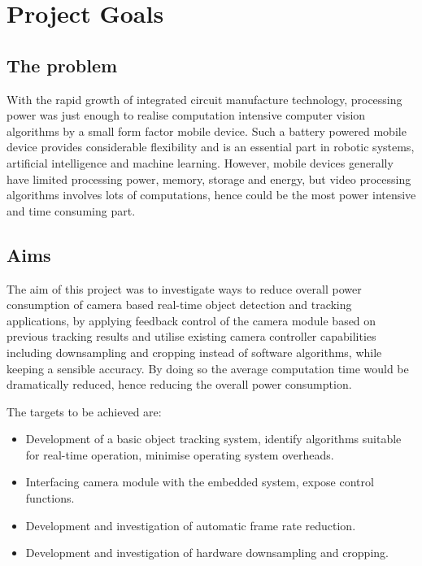 \chapter{Project Goals} \label{Chapter:Goals}

\section{The problem}

With the rapid growth of integrated circuit manufacture technology, processing power was just enough to realise computation intensive computer vision algorithms by a small form factor mobile device. Such a battery powered mobile device provides considerable flexibility and is an essential part in robotic systems, artificial intelligence and machine learning. However, mobile devices generally have limited processing power, memory, storage and energy, but video processing algorithms involves lots of computations, hence could be the most power intensive and time consuming part.

\section{Aims}

The aim of this project was to investigate ways to reduce overall power consumption of camera based real-time object detection and tracking applications, by applying feedback control of the camera module based on previous tracking results and utilise existing camera controller capabilities including downsampling and cropping instead of software algorithms, while keeping a sensible accuracy. By doing so the average computation time would be dramatically reduced, hence reducing the overall power consumption.

The targets to be achieved are:

\begin{itemize}
  \item Development of a basic object tracking system, identify algorithms suitable for real-time operation, minimise operating system overheads.
  \item Interfacing camera module with the embedded system, expose control functions.
  \item Development and investigation of automatic frame rate reduction.
  \item Development and investigation of hardware downsampling and cropping.
\end{itemize}
